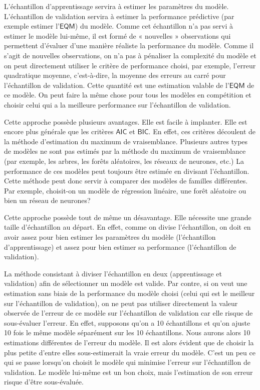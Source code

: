 \documentclass[
  11pt,
  letterpaper,
]{book}
\theoremstyle{definition}
\theoremstyle{remark}
\begin{document}
L'échantillon d'apprentissage servira à estimer les paramètres du
modèle. L'échantillon de validation servira à estimer la performance
prédictive (par exemple estimer l'\(\mathsf{EQM}\)) du modèle. Comme cet
échantillon n'a pas servi à estimer le modèle lui-même, il est formé de
« nouvelles » observations qui permettent d'évaluer d'une manière
réaliste la performance du modèle. Comme il s'agit de nouvelles
observations, on n'a pas à pénaliser la complexité du modèle et on peut
directement utiliser le critère de performance choisi, par exemple,
l'erreur quadratique moyenne, c'est-à-dire, la moyenne des erreurs au
carré pour l'échantillon de validation. Cette quantité est une
estimation valable de l'\(\mathsf{EQM}\) de ce modèle. On peut faire la
même chose pour tous les modèles en compétition et choisir celui qui a
la meilleure performance sur l'échantillon de validation.

Cette approche possède plusieurs avantages. Elle est facile à implanter.
Elle est encore plus générale que les critères \(\mathsf{AIC}\) et
\(\mathsf{BIC}\). En effet, ces critères découlent de la méthode
d'estimation du maximum de vraisemblance. Plusieurs autres types de
modèles ne sont pas estimés par la méthode du maximum de vraisemblance
(par exemple, les arbres, les forêts aléatoires, les réseaux de
neurones, etc.) La performance de ces modèles peut toujours être estimée
en divisant l'échantillon. Cette méthode peut donc servir à comparer des
modèles de familles différentes. Par exemple, choisit-on un modèle de
régression linéaire, une forêt aléatoire ou bien un réseau de neurones?

Cette approche possède tout de même un désavantage. Elle nécessite une
grande taille d'échantillon au départ. En effet, comme on divise
l'échantillon, on doit en avoir assez pour bien estimer les paramètres
du modèle (l'échantillon d'apprentissage) et assez pour bien estimer sa
performance (l'échantillon de validation).

La méthode consistant à diviser l'échantillon en deux (apprentissage et
validation) afin de sélectionner un modèle est valide. Par contre, si on
veut une estimation sans biais de la performance du modèle choisi (celui
qui est le meilleur sur l'échantillon de validation), on ne peut pas
utiliser directement la valeur observée de l'erreur de ce modèle sur
l'échantillon de validation car elle risque de sous-évaluer l'erreur. En
effet, supposons qu'on a 10 échantillons et qu'on ajuste 10 fois le même
modèle séparément sur les 10 échantillons. Nous aurons alors 10
estimations différentes de l'erreur du modèle. Il est alors évident que
de choisir la plus petite d'entre elles sous-estimerait la vraie erreur
du modèle. C'est un peu ce qui se passe lorsqu'on choisit le modèle qui
minimise l'erreur sur l'échantillon de validation. Le modèle lui-même
est un bon choix, mais l'estimation de son erreur risque d'être
sous-évaluée.
\end{document}
